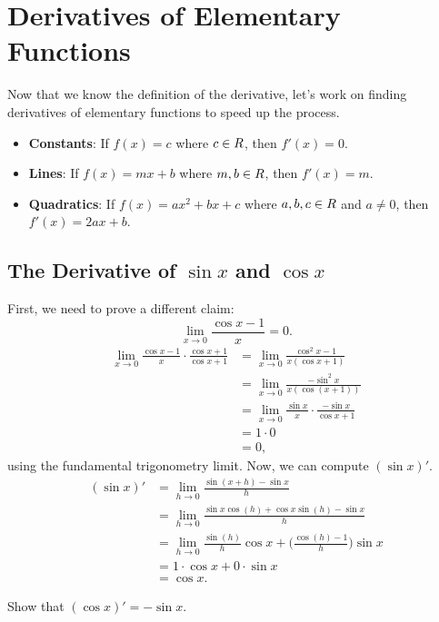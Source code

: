 \section{Derivatives of Elementary Functions}
Now that we know the definition of the derivative, let's work on finding
derivatives of elementary functions to speed up the process.
\begin{itemize}
    \item \textbf{Constants}: If $ f(x)=c $ where $ c\in\relax{R} $, then $ f'(x)=0 $.
    \item \textbf{Lines}: If $ f(x)=mx+b $ where $ m,b\in\relax{R} $, then $ f'(x)=m $.
    \item \textbf{Quadratics}: If $ f(x)=ax^2+bx+c $ where $ a,b,c\in\relax{R} $ and $ a\ne 0 $, then $ f'(x)=2ax+b $.
\end{itemize}
\subsection{The Derivative of $ \sin x $ and $ \cos x $}
First, we need to prove a different claim:
\[ \displaystyle \lim\limits_{{x} \to {0}}\frac{\cos x-1}{x}=0. \]
\begin{align*}
    \lim\limits_{{x} \to {0}} \frac{\cos x-1}{x}\cdot \frac{\cos x+1}{\cos x+1}
     & =\lim\limits_{{x} \to {0}}\frac{\cos^2 x-1}{x(\cos x+1)}                 \\
     & =\lim\limits_{{x} \to {0}}\frac{-\sin^2 x}{x(\cos(x+1))}                 \\
     & =\lim\limits_{{x} \to {0}}\frac{\sin x}{x}\cdot \frac{-\sin x}{\cos x+1} \\
     & =1\cdot 0                                                                \\
     & =0,
\end{align*}
using the fundamental trigonometry limit. Now, we can compute $ (\sin x)' $.
\begin{align*}
    (\sin x)'
     & =\lim\limits_{{h} \to {0}}\frac{\sin(x+h)-\sin x}{h}                                      \\
     & =\lim\limits_{{h} \to {0}}\frac{\sin x\cos(h)+\cos x\sin(h)-\sin x}{h}                    \\
     & =\lim\limits_{{h} \to {0}}\frac{\sin(h)}{h}\cos x+\biggl(\frac{\cos(h)-1}{h}\biggr)\sin x \\
     & =1\cdot \cos x+0\cdot \sin x                                                              \\
     & =\cos x.
\end{align*}
\begin{Exercise}{}{}
    Show that $ (\cos x)'=-\sin x $.
\end{Exercise}
